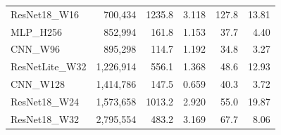 \begin{table}[h]
\begin{tabular}{lrrrrr}
ResNet18\_W16 & 700,434 & 1235.8 & 3.118 & 127.8 & 13.81 \\
MLP\_H256 & 852,994 & 161.8 & 1.153 & 37.7 & 4.40 \\
CNN\_W96 & 895,298 & 114.7 & 1.192 & 34.8 & 3.27 \\
ResNetLite\_W32 & 1,226,914 & 556.1 & 1.368 & 48.6 & 12.93 \\
CNN\_W128 & 1,414,786 & 147.5 & 0.659 & 40.3 & 3.72 \\
ResNet18\_W24 & 1,573,658 & 1013.2 & 2.920 & 55.0 & 19.87 \\
ResNet18\_W32 & 2,795,554 & 483.2 & 3.169 & 67.7 & 8.06 \\
\bottomrule
\end{tabular}
\end{table}
